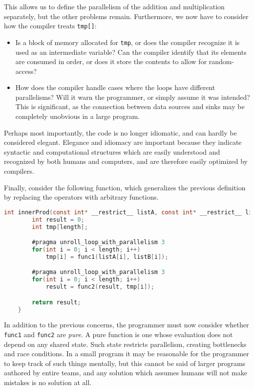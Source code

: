 \documentclass[english,onecolumn]{scrartcl}
\begin{document}
This allows us to define the parallelism of the addition and multiplication separately, but the other problems remain.
Furthermore, we now have to consider how the compiler treats \texttt{tmp[]}:
\begin{itemize}
    \item Is a block of memory allocated for \texttt{tmp}, or does the compiler recognize it is used as an intermediate variable?
            Can the compiler identify that its elements are consumed in order, or does it store the contents to allow for
            random-access?
    \item How does the compiler handle cases where the loops have different parallelisms? Will it warn the programmer, or simply
            assume it was intended? This is significant, as the connection between data sources and sinks may be completely
            unobvious in a large program.
\end{itemize}
Perhaps most importantly, the code is no longer idiomatic, and can hardly be considered elegant. Elegance and idiomacy are
important because they indicate syntactic and computational structures which are easily understood and recognized by both humans
and computers, and are therefore easily optimized by compilers.

Finally, consider the following function, which generalizes the previous definition by replacing the operators with arbitrary
functions.

\begin{lstlisting}[language=C]
    int innerProd(const int* __restrict__ listA, const int* __restrict__ listB, int length){
        int result = 0;
        int tmp[length];

        #pragma unroll_loop_with_parallelism 3
        for(int i = 0; i < length; i++)
            tmp[i] = func1(listA[i], listB[i]);

        #pragma unroll_loop_with_parallelism 3
        for(int i = 0; i < length; i++)
            result = func2(result, tmp[i]);

        return result;
    }
\end{lstlisting}

In addition to the previous concerns, the programmer must now consider whether \texttt{func1} and \texttt{func2} are
\textit{pure}. A pure function is one whose evaluation does not depend on any shared state. Such state restricts parallelism,
creating bottlenecks and race conditions. In a small program it may be reasonable for the programmer to keep track of such things
mentally, but this cannot be said of larger programs authored by entire teams, and any solution which assumes humans will not make
mistakes is no solution at all.
\end{document}
